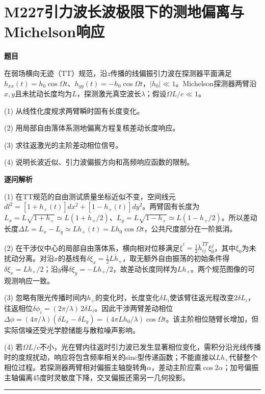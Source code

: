 \documentclass[UTF8,a4paper,11pt,oneside,openany]{ctexbook}
\begin{document}
\section*{M227\quad 引力波长波极限下的测地偏离与Michelson响应}
\textbf{题目}\par
在弱场横向无迹（TT）规范，沿$z$传播的线偏振引力波在探测器平面满足$h_{xx}(t)=h_0\cos\Omega t$、$h_{yy}(t)=-h_0\cos\Omega t$，$|h_0|\ll1$。Michelson探测器两臂沿$x,y$且未扰动长度均为$L$，探测激光真空波长$\lambda$；假设$\Omega L/c\ll1$。
\par\smallskip\noindent (1) 从线性化度规求两臂瞬时固有长度变化。
\par\smallskip\noindent (2) 用局部自由落体系测地偏离方程复核差动长度响应。
\par\smallskip\noindent (3) 求往返激光的主阶差动相位信号。
\par\smallskip\noindent (4) 说明长波近似、引力波偏振方向和高频响应函数的限制。
\par\medskip\textbf{逐问解析}\par
\par\smallskip\noindent (1) 在TT规范的自由测试质量坐标近似不变，空间线元$dl^2=[1+h_+(t)]dx^2+[1-h_+(t)]dy^2$。两臂固有长度为$L_x=L\sqrt{1+h_+}\simeq L(1+h_+/2)$、$L_y=L\sqrt{1-h_+}\simeq L(1-h_+/2)$。所以差动长度$\Delta L=L_x-L_y\simeq Lh_+(t)=Lh_0\cos\Omega t$，公共尺度部分在一阶抵消。
\par\smallskip\noindent (2) 在干涉仪中心的局部自由落体系，横向相对位移满足$\ddot\xi^i=\frac12\ddot h_{ij}^{TT}\xi_0^j$，其中$\xi_0$为未扰动分离。对沿$x$的基线有$\ddot{\delta\xi_x}=\frac12L\ddot h_+$，取无额外自由振荡的初始条件得$\delta\xi_x=Lh_+/2$；沿$y$得$\delta\xi_y=-Lh_+/2$，故差动长度同样为$Lh_+$。两个规范图像的可观测响应一致。
\par\smallskip\noindent (3) 忽略有限光传播时间内$h_+$的变化时，长度变化$\delta L_i$使该臂往返光程改变$2\delta L_i$，往返相位$\delta\phi_i=(2\pi/\lambda)\,2\delta L_i$。因此干涉两臂差动相位$\Delta\phi=(4\pi/\lambda)(\delta L_x-\delta L_y)=(4\pi Lh_0/\lambda)\cos\Omega t$。该主阶相位随臂长增加，但实际信噪还受光学腔储能与散粒噪声影响。
\par\smallskip\noindent (4) 若$\Omega L/c$不小，光在臂内往返时引力波已发生显著相位变化，需积分沿光线传播时的度规扰动，响应将包含频率相关的sinc型传递函数；不能直接以$Lh_+$代替整个相位过程。若探测器两臂相对偏振主轴旋转角$\alpha$，差动主阶应乘$\cos2\alpha$；加号偏振主轴偏离45度时灵敏度下降，交叉偏振还需另一几何投影。
\par\medskip\hrule\medskip
\end{document}
